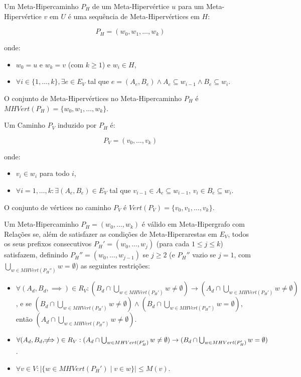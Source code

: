 \documentclass{article}
\begin{document}
Um Meta-Hipercaminho \( P_H \) de um Meta-Hipervértice \( u \) para um Meta-Hipervértice \( v \) em \( U \) é uma sequência de Meta-Hipervértices em \( H \):

\[ P_H = (w_0, w_1, \dots, w_k) \]

onde:

\begin{itemize}
    \item \( w_0 = u \) e \( w_k = v \) (com \( k \geq 1 \)) e \( w_i \in H \),
    \item \( \forall i \in \{1, \dots, k\}, \exists e \in E_V \) tal que \( e = (A_e, B_e) \wedge A_e \subseteq w_{i-1} \wedge B_e \subseteq w_i \).
\end{itemize}

O conjunto de Meta-Hipervértices no Meta-Hipercaminho \( P_H \) é \( MHVert(P_H) = \{ w_0, w_1, \dots, w_k \} \).

Um Caminho \( P_V \) induzido por \( P_H \) é:

\[ P_V = (v_0, \dots, v_k) \]

onde:

\begin{itemize}
    \item \( v_i \in w_i \) para todo \( i \),
    \item \( \forall i = 1, \dots, k: \exists (A_e, B_e) \in E_V \) tal que \( v_{i-1} \in A_e \subseteq w_{i-1} \), \( v_i \in B_e \subseteq w_i \).
\end{itemize}

O conjunto de vértices no caminho \( P_V \) é \( Vert(P_V) = \{ v_0, v_1, \dots, v_k \} \).
\newpage

Um Meta-Hipercaminho \( P_H = (w_0, \dots, w_k) \) é válido em Meta-Hipergrafo com Relações se, além de satisfazer as condições de Meta-Hiperarestas em \( E_V \), todos os seus prefixos consecutivos \( P_H' = (w_0, \dots, w_j) \) (para cada \( 1 \leq j \leq k \)) satisfazem, definindo \( P_H'' = (w_0, \dots, w_{j-1}) \) se \( j \geq 2 \) (e \( P_H'' \) vazio se \( j = 1 \), com \( \bigcup_{w \in MHVert(P_H'')} w = \emptyset \))  as seguintes restrições:

\begin{itemize}
    \item \( \forall (A_d, B_d, \implies) \in R_V: (B_d \cap \bigcup_{w \in MHVert(P_H')} w \neq \emptyset) \to (A_d \cap \bigcup_{w \in MHVert(P_H')} w \neq \emptyset) \), e se \( (B_d \cap \bigcup_{w \in MHVert(P_H')} w \neq \emptyset) \wedge (B_d \cap \bigcup_{w \in MHVert(P_H'')} w = \emptyset) \), então \( (A_d \cap \bigcup_{w \in MHVert(P_H'')} w \neq \emptyset) \).
    \item \( \forall (A_d, B_d, \not\!\!\!\implies) \in R_V: (A_d \cap \bigcup_{w \in MHVert(P_H')} w \neq \emptyset) \to (B_d \cap \bigcup_{w \in MHVert(P_H')} w = \emptyset) \).
    \item \( \forall v \in V: |\{ w \in MHVert(P_H') \mid v \in w \}| \leq M(v) \).
\end{itemize}
\end{document}
